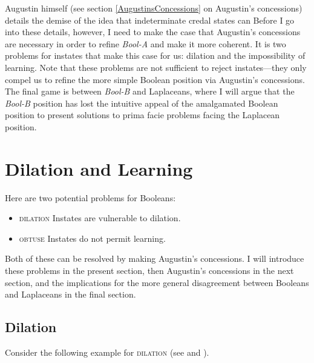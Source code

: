 \documentclass[11pt]{article}
\newcommand{\anderson}[0]{\textit{Bool-A}}
\newcommand{\augustin}[0]{\textit{Bool-B}}
\begin{document}
Augustin himself (see section \ref{AugustinsConcessions} on Augustin's
concessions) details the demise of the idea that indeterminate credal
states can  Before
I go into these details, however, I need to make the case that
Augustin's concessions are necessary in order to refine {\anderson}
and make it more coherent. It is two problems for instates that make
this case for us: dilation and the impossibility of learning. Note
that these problems are not sufficient to reject instates---they only
compel us to refine the more simple Boolean position via Augustin's
concessions. The final game is between {\augustin} and Laplaceans,
where I will argue that the {\augustin} position has lost the
intuitive appeal of the amalgamated Boolean position to present
solutions to prima facie problems facing the Laplacean position.

\section{Dilation and Learning}
\label{DilationLearningAndEntropy}

Here are two potential problems for Booleans:

\begin{itemize}
\item \textsc{dilation} Instates are vulnerable to dilation.
\item \textsc{obtuse} Instates do not permit learning.
\end{itemize}

Both of these can be resolved by making Augustin's concessions. I will
introduce these problems in the present section, then Augustin's
concessions in the next section, and the implications for the more
general disagreement between Booleans and Laplaceans in the final
section.

\subsection{Dilation}
\label{dilation}

Consider the following example for \textsc{dilation} (see
 and ).
\end{document}
